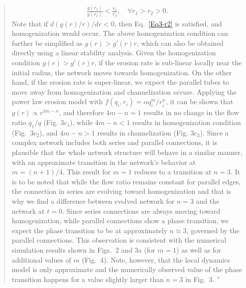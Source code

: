 \documentclass{article}
\newcommand{\Answer}[1]{\noindent {\color{blue}{ #1}}\normalcolor}
\def\p{\textit{p.~}}
\begin{document}
{\begin{quote}
\begin{align}
        \frac{g(r_1)}{g(r_2)}<\frac{r_1}{r_2}, \quad \forall r_1>r_2>0.   \label{Eq3-r2}
    \end{align}
    Note that if $d\left(g(r)/r\right)/dr<0$, then Eq.~\eqref{Eq3-r2} is satisfied, and homogenization would occur.
    The above homogenization condition can further be simplified as $g(r)>g'(r)r$, which can also be obtained directly using a linear stability analysis. Given the homogenization condition $g(r)>g'(r)r$, if the erosion rate is sub-linear locally near the initial radius, the network moves towards homogenization. On the other hand, if the erosion rate is super-linear, we expect the parallel tubes to move away from homogenization and channelization occurs. Applying the power law erosion model with $f(q_{i},r_i)=\alpha q_i^m/r_i^n$, it can be shown that $g(r) \propto  r^{4m-n} $, and therefore $4m-n=1$ results in no change in the flow ratio $q_1/q$ (Fig. 3c$_1$), while $4m-n<1$ results in homogenization condition (Fig.~3c$_2$), and $4m-n>1$ results in channelization (Fig. 3c$_3$). Since a complex network includes both series and parallel connections, it is plausible that the whole network structure will behave in a similar manner, with an approximate transition in the network's behavior at $ m = (n+1)/4$. This result for $m=1$ reduces to a transition at $n=3$. It is to be noted that while the flow ratio remains constant for parallel edges, the connection in series are evolving toward homogenization and that is why we find a difference between evolved network for $n=3$ and the network at $t=0$. Since series connections are always moving toward homogenization, while parallel connections show a phase transition, we expect the phase transition to be at approximately $n\approx 3$, governed by the parallel connections. This observation  is consistent with the numerical simulation results shown in Figs.~2 and 3a (for $m=1$) as well as for additional values of $m$ (Fig.~4). Note, however, that the local dynamics model is only approximate and the numerically observed value of the phase transition happens for a value slightly larger than $n=3$ in Fig.~3. ''
    \end{quote}
}




\vspace{4mm}

\Answer{$\bullet$ From \p2 of the main text:}
\end{document}
